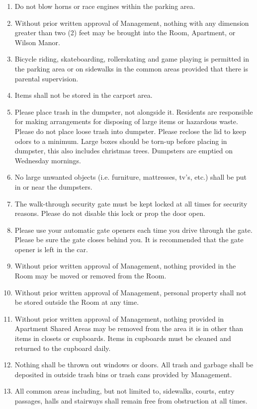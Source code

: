 \documentclass[12pt,letterpaper]{article}
\newcommand{\management}{Management}
\newcommand{\condo}{Wilson Manor}
\newcommand{\apt}{Apartment}
\newcommand{\room}{Room}
\newcommand{\shared}{Apartment Shared Areas}
\begin{document}
\begin{enumerate}
	\item Do not blow horns or race engines within the parking area. 
	\item Without prior written approval of \management{}, nothing with any dimension greater than two (2) feet may be brought into the \room{}, \apt{}, or \condo{}.
	\item Bicycle riding, skateboarding, rollerskating and game playing is permitted in the parking area or on sidewalks in the common areas provided that there is parental supervision.
	\item Items shall not be stored in the carport area.
	\item Please place trash in the dumpster, not alongside it. Residents are responsible for making arrangements for disposing of large items or hazardous waste. Please do not place loose trash into dumpster. Please reclose the lid to keep odors to a minimum. Large boxes should be torn-up before placing in dumpster, this also includes christmas trees. Dumpsters are emptied on Wednesday mornings. 
	\item No large unwanted objects (i.e. furniture, mattresses, tv's, etc.) shall be put in or near the dumpsters.
	\item The walk-through security gate must be kept locked at all times for security reasons. Please do not disable this lock or prop the door open. 
	\item Please use your automatic gate openers each time you drive through the gate. Please be sure the gate closes behind you. It is recommended that the gate opener is left in the car.
	\item Without prior written approval of \management{}, nothing provided in the \room{} may be moved or removed from the \room{}.
	\item Without prior written approval of \management{}, personal property shall not be stored outside the \room{} at any time. 
	\item Without prior written approval of \management{}, nothing provided in \shared{} may be removed from the area it is in other than items in closets or cupboards. Items in cupboards must be cleaned and returned to the cupboard daily.
	\item Nothing shall be thrown out windows or doors. All trash and garbage shall be deposited in outside trash bins or trash cans provided by \management{}. 
	\item All common areas including, but not limited to, sidewalks, courts, entry passages, halls and stairways shall remain free from obstruction at all times. 

\end{enumerate}
\end{document}
